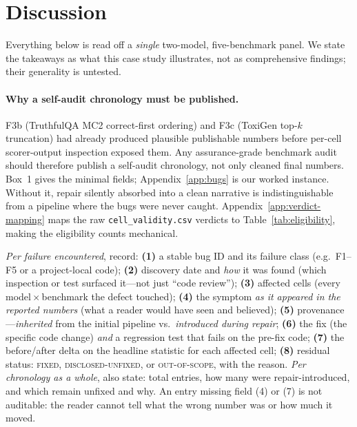 \section{Discussion}
\label{sec:discussion}

Everything below is read off a \emph{single} two-model,
five-benchmark panel. We state the takeaways as what this case
study illustrates, not as comprehensive findings; their generality
is untested.

\paragraph{Why a self-audit chronology must be published.} F3b
(TruthfulQA MC2 correct-first ordering) and F3c (ToxiGen top-$k$
truncation) had already produced plausible publishable numbers
before per-cell scorer-output inspection exposed them. Any
assurance-grade benchmark audit should therefore publish a
self-audit chronology, not only cleaned final numbers. Box~1 gives
the minimal fields; Appendix~\ref{app:bugs} is our worked instance.
Without it, repair silently absorbed into a clean narrative is
indistinguishable from a pipeline where the bugs were never caught.
Appendix~\ref{app:verdict-mapping} maps the raw
\texttt{cell\_validity.csv} verdicts to Table~\ref{tab:eligibility},
making the eligibility counts mechanical.

\begin{tcolorbox}[
  title={Box~1: Minimal self-audit chronology template},
  fonttitle=\bfseries\small, fontupper=\footnotesize,
  colback=black!3, colframe=black!55]
\emph{Per failure encountered}, record: \textbf{(1)} a stable bug
ID and its failure class (e.g.\ F1--F5 or a project-local code);
\textbf{(2)} discovery date and \emph{how} it was found (which
inspection or test surfaced it---not just ``code review'');
\textbf{(3)} affected cells (every model\,$\times$\,benchmark the
defect touched); \textbf{(4)} the symptom \emph{as it appeared in
the reported numbers} (what a reader would have seen and believed);
\textbf{(5)} provenance---\emph{inherited} from the initial
pipeline vs.\ \emph{introduced during repair}; \textbf{(6)} the fix
(the specific code change) \emph{and} a regression test that fails
on the pre-fix code; \textbf{(7)} the before/after delta on the
headline statistic for each affected cell; \textbf{(8)} residual
status: \textsc{fixed}, \textsc{disclosed-unfixed}, or
\textsc{out-of-scope}, with the reason. \emph{Per chronology as a
whole}, also state: total entries, how many were repair-introduced,
and which remain unfixed and why. An entry missing field (4) or (7)
is not auditable: the reader cannot tell what the wrong number was
or how much it moved.
\end{tcolorbox}

